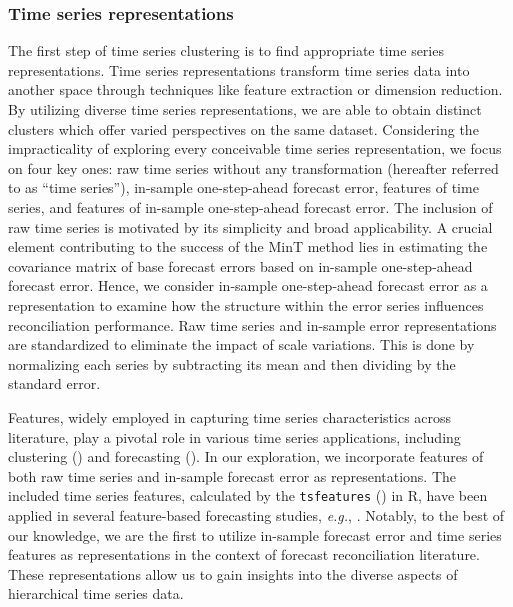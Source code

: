 \documentclass[a4paper,review,12pt,authoryear]{elsarticle}
\let\code=\texttt
\begin{document}
\subsubsection{Time series representations}


The first step of time series clustering is to find appropriate time series representations. Time series representations transform time series data into another space through techniques like feature extraction or dimension reduction. By utilizing diverse time series representations, we are able to obtain distinct clusters which offer varied perspectives on the same dataset.
Considering the impracticality of exploring every conceivable time series representation, we focus on four key ones: raw time series without any transformation (hereafter referred to as ``time series''), in-sample one-step-ahead forecast error, features of time series, and features of in-sample one-step-ahead forecast error.
The inclusion of raw time series is motivated by its simplicity and broad applicability.
A crucial element contributing to the success of the MinT method lies in estimating the covariance matrix of base forecast errors based on in-sample one-step-ahead forecast error. Hence, we consider in-sample one-step-ahead forecast error as a representation to examine how the structure within the error series influences reconciliation performance. 
Raw time series and in-sample error representations are standardized to eliminate the impact of scale variations. This is done by normalizing each series by subtracting its mean and then dividing by the standard error.

Features, widely employed in capturing time series characteristics across literature, play a pivotal role in various time series applications, including clustering (\citealp{tianoFeatTSFeaturebasedTime2021}) and forecasting (\citealp{wangUncertaintyEstimationFeaturebased2022, liFeaturebasedIntermittentDemand2023}). In our exploration, we incorporate features of both raw time series and in-sample forecast error as representations. The included time series features, calculated by the \code{tsfeatures} (\citealp{tsfeatures}) in R, have been applied in several feature-based forecasting studies, \textit{e.g.}, \cite{montero-mansoFFORMAFeaturebasedForecast2020}.
Notably, to the best of our knowledge, we are the first to utilize in-sample forecast error and time series features as representations in the context of forecast reconciliation literature.
These representations allow us to gain insights into the diverse aspects of hierarchical time series data.
\end{document}
